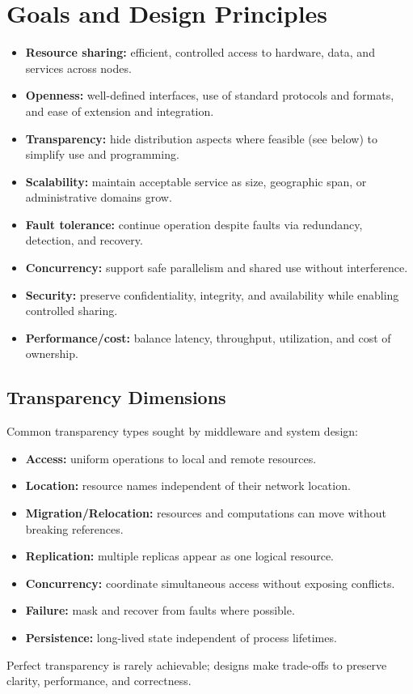 \documentclass[a4paper,12pt]{book}
\begin{document}
\section{Goals and Design Principles}
\begin{itemize}
  \item \textbf{Resource sharing:} efficient, controlled access to hardware, data, and services across nodes.
  \item \textbf{Openness:} well-defined interfaces, use of standard protocols and formats, and ease of extension and integration.
  \item \textbf{Transparency:} hide distribution aspects where feasible (see below) to simplify use and programming.
  \item \textbf{Scalability:} maintain acceptable service as size, geographic span, or administrative domains grow.
  \item \textbf{Fault tolerance:} continue operation despite faults via redundancy, detection, and recovery.
  \item \textbf{Concurrency:} support safe parallelism and shared use without interference.
  \item \textbf{Security:} preserve confidentiality, integrity, and availability while enabling controlled sharing.
  \item \textbf{Performance/cost:} balance latency, throughput, utilization, and cost of ownership.
\end{itemize}

\subsection{Transparency Dimensions}
Common transparency types sought by middleware and system design:
\begin{itemize}
  \item \textbf{Access:} uniform operations to local and remote resources.
  \item \textbf{Location:} resource names independent of their network location.
  \item \textbf{Migration/Relocation:} resources and computations can move without breaking references.
  \item \textbf{Replication:} multiple replicas appear as one logical resource.
  \item \textbf{Concurrency:} coordinate simultaneous access without exposing conflicts.
  \item \textbf{Failure:} mask and recover from faults where possible.
  \item \textbf{Persistence:} long-lived state independent of process lifetimes.
\end{itemize}
Perfect transparency is rarely achievable; designs make trade-offs to preserve clarity, performance, and correctness.
\end{document}
